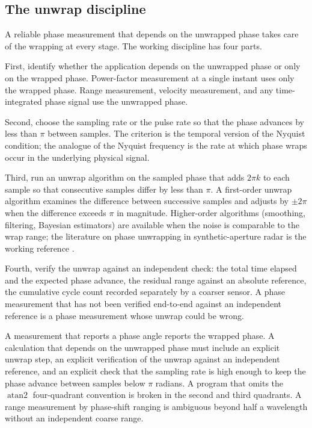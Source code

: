 \subsection{The unwrap discipline}

A reliable phase measurement that depends on the unwrapped phase
takes care of the wrapping at every stage. The working
discipline has four parts.

First, identify whether the application depends on the unwrapped
phase or only on the wrapped phase. Power-factor measurement at a
single instant uses only the wrapped phase. Range measurement,
velocity measurement, and any time-integrated phase signal use
the unwrapped phase.

Second, choose the sampling rate or the pulse rate so that the
phase advances by less than $\pi$ between samples. The criterion
is the temporal version of the Nyquist condition; the analogue
of the Nyquist frequency is the rate at which phase wraps occur
in the underlying physical signal.

Third, run an unwrap algorithm on the sampled phase that adds
$2\pi k$ to each sample so that consecutive samples differ by less
than $\pi$. A first-order unwrap algorithm examines the
difference between successive samples and adjusts by $\pm 2\pi$
when the difference exceeds $\pi$ in magnitude. Higher-order
algorithms (smoothing, filtering, Bayesian estimators) are
available when the noise is comparable to the wrap range; the
literature on phase unwrapping in synthetic-aperture radar is the
working reference \cite{text:v2ch03-ghiglia-pritt-unwrap}.

Fourth, verify the unwrap against an independent check: the
total time elapsed and the expected phase advance, the residual
range against an absolute reference, the cumulative cycle count
recorded separately by a coarser sensor. A phase measurement
that has not been verified end-to-end against an independent
reference is a phase measurement whose unwrap could be wrong.

\begin{principle}
A measurement that reports a phase angle reports the wrapped
phase. A calculation that depends on the unwrapped phase must
include an explicit unwrap step, an explicit verification of the
unwrap against an independent reference, and an explicit check
that the sampling rate is high enough to keep the phase advance
between samples below $\pi$ radians. A program that omits the
$\operatorname{atan2}$ four-quadrant convention is broken in the
second and third quadrants. A range measurement by phase-shift
ranging is ambiguous beyond half a wavelength without an
independent coarse range.
\end{principle}

